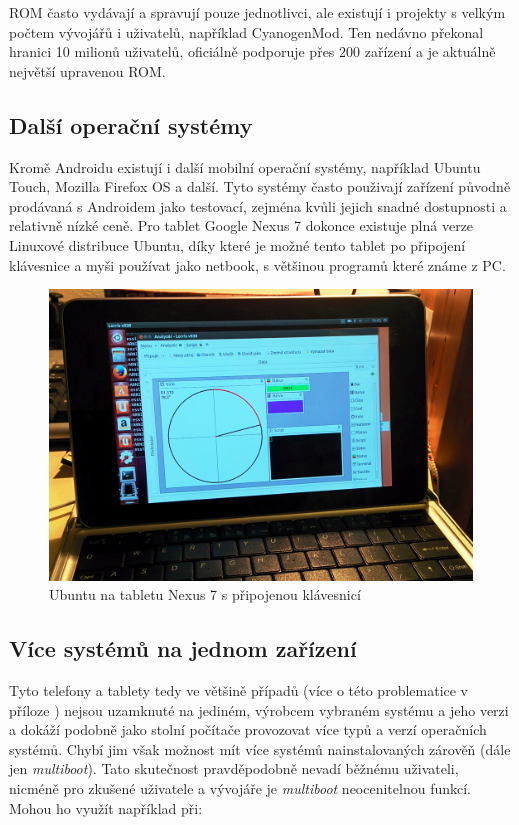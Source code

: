 \documentclass[12pt, a4paper, oneside]{article}
\newcommand{\It}{\textit}  %
\begin{document}
ROM často vydávají a spravují pouze jednotlivci, ale existují i projekty s velkým počtem vývojářů i uživatelů, například CyanogenMod\cite{CM}. Ten nedávno překonal hranici 10 milionů uživatelů, oficiálně podporuje přes 200 zařízení a je aktuálně největší upravenou ROM.

\subsection{Další operační systémy}
Kromě Androidu existují i další mobilní operační systémy, například Ubuntu Touch\cite{utouch}, Mozilla Firefox OS\cite{firefoxos} a další. Tyto systémy často použivají zařízení původně prodávaná s Androidem jako testovací, zejména kvůli jejich snadné dostupnosti a relativně nízké ceně. Pro tablet Google Nexus 7 dokonce existuje plná verze Linuxové distribuce Ubuntu, díky které je možné tento tablet po připojení klávesnice a myši používat jako netbook, s většinou programů které známe z PC.

\begin{figure}[H]
\begin{center}
\includegraphics[width=\textwidth]{img/n7_ubuntu.jpg}
\caption{Ubuntu na tabletu Nexus 7 s připojenou klávesnicí}
\label{split_img}
\end{center}
\end{figure}


\subsection{Více systémů na jednom zařízení}
Tyto telefony a tablety tedy ve většině případů (více o této problematice v příloze ) nejsou uzamknuté na jediném, výrobcem vybraném systému a jeho verzi a dokáží podobně jako stolní počítače provozovat více typů a verzí operačních systémů. Chybí jim však možnost mít více systémů nainstalovaných zárověň (dále jen \It{multiboot}). Tato skutečnost pravděpodobně nevadí běžnému uživateli, nicméně pro zkušené uživatele a vývojáře je \It{multiboot} neocenitelnou funkcí. Mohou ho využít například při:
\end{document}
